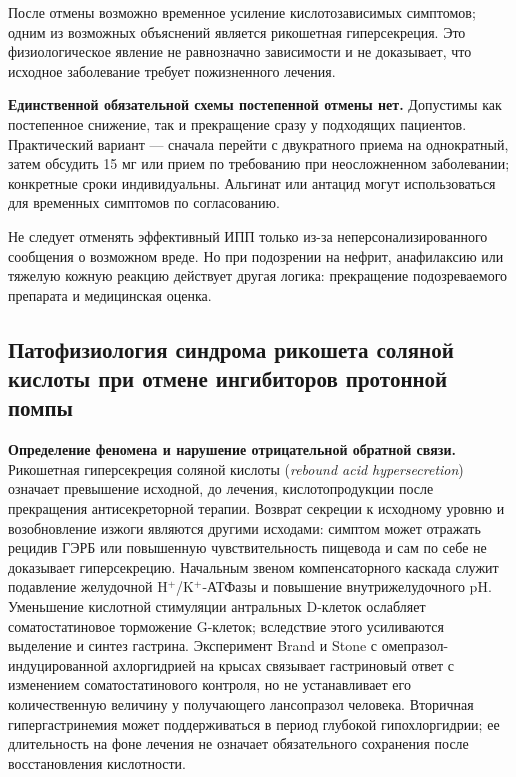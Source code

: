 \documentclass[11pt,a4paper,notitlepage]{report}
\newcommand{\src}[1]{\unskip\space\cite{#1}}
\begin{document}
После отмены возможно временное усиление кислотозависимых симптомов; одним из возможных объяснений является рикошетная гиперсекреция. Это физиологическое явление не равнозначно зависимости и не доказывает, что исходное заболевание требует пожизненного лечения.\src{agadepres}

\textbf{Единственной обязательной схемы постепенной отмены нет.} Допустимы как постепенное снижение, так и прекращение сразу у подходящих пациентов. Практический вариант --- сначала перейти с двукратного приема на однократный, затем обсудить 15 мг или прием по требованию при неосложненном заболевании; конкретные сроки индивидуальны. Альгинат или антацид могут использоваться для временных симптомов по согласованию.\src{agadepres,nice}

Не следует отменять эффективный ИПП только из-за неперсонализированного сообщения о возможном вреде. Но при подозрении на нефрит, анафилаксию или тяжелую кожную реакцию действует другая логика: прекращение подозреваемого препарата и медицинская оценка.\src{agadepres,uslabel}

\subsection{Патофизиология синдрома рикошета соляной кислоты при отмене ингибиторов протонной помпы}
\label{sec:rebound-mechanism}
\textbf{Определение феномена и нарушение отрицательной обратной связи.} Рикошетная гиперсекреция соляной кислоты (\textit{rebound acid hypersecretion}) означает превышение исходной, до лечения, кислотопродукции после прекращения антисекреторной терапии. Возврат секреции к исходному уровню и возобновление изжоги являются другими исходами: симптом может отражать рецидив ГЭРБ или повышенную чувствительность пищевода и сам по себе не доказывает гиперсекрецию.\src{withdrawbell,acggerd} Начальным звеном компенсаторного каскада служит подавление желудочной H$^+$/K$^+$-АТФазы и повышение внутрижелудочного pH. Уменьшение кислотной стимуляции антральных D-клеток ослабляет соматостатиновое торможение G-клеток; вследствие этого усиливаются выделение и синтез гастрина. Эксперимент Brand и Stone с омепразол-индуцированной ахлоргидрией на крысах связывает гастриновый ответ с изменением соматостатинового контроля, но не устанавливает его количественную величину у получающего лансопразол человека. Вторичная гипергастринемия может поддерживаться в период глубокой гипохлоргидрии; ее длительность на фоне лечения не означает обязательного сохранения после восстановления кислотности.\src{withdrawbrand1988,uslabel}
\end{document}

